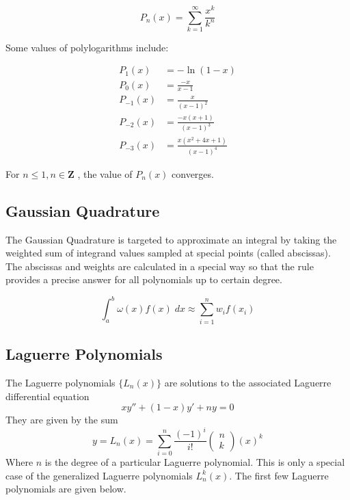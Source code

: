 \documentclass[a4paper, 11pt]{article}
\begin{document}
\begin{equation}\label{eqn:poly}
P_n(x) = \sum_{k=1}^{\infty} \frac{x^k}{k^n}
\end{equation}

Some values of polylogarithms include:

\begin{align*}
P_1(x) &= -\ln(1-x)\\
P_0(x) &= \frac{-x}{x-1}\\
P_{-1}(x) &= \frac{x}{(x-1)^2}\\
P_{-2}(x) &= \frac{-x(x+1)}{(x-1)^3}\\
P_{-3}(x) &= \frac{x(x^2+4x+1)}{(x-1)^4}
\end{align*}

For $n \leq 1, n \in \mathbf{Z}$ , the value of $P_n(x)$ converges.

\subsection{Gaussian Quadrature}
The Gaussian Quadrature\cite{bib:sci} is targeted to approximate an integral by taking the weighted sum of integrand values sampled at special points (called abscissas). The abscissas and weights are calculated in a special way so that the rule provides a precise answer for all polynomials up to certain degree. 

\begin{equation}
\int_{a}^{b}\omega(x)f(x)\;dx \approx \sum_{i=1}^{n} w_i f(x_i)
\end{equation}

\subsection{Laguerre Polynomials}
The Laguerre polynomials\cite{bib:lagpoly} $\lbrace L_n(x)\rbrace$ are solutions to the associated Laguerre differential equation
\begin{equation}\label{eqn:lpoly}
xy''+(1-x)y'+ny=0
\end{equation}
They are given by the sum
\begin{equation}
y=L_n(x) = \sum_{i=0}^{n}\frac{(-1)^i}{i!}
\begin{pmatrix}
n\\k
\end{pmatrix}
(x)^k
\end{equation}
Where $n$ is the degree of a particular Laguerre polynomial. This is only a special case of the generalized Laguerre polynomials $L^k_n(x)$. The first few Laguerre polynomials are given below.
\end{document}
